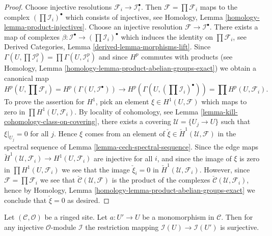 \begin{proof}
Choose injective resolutions $\mathcal{F}_i \to \mathcal{I}_i^\bullet$.
Then $\mathcal{F} = \prod \mathcal{F}_i$ maps to the complex
$(\prod \mathcal{I}_i)^\bullet$ which consists of injectives, see
Homology, Lemma \ref{homology-lemma-product-injectives}.
Choose an injective resolution $\mathcal{F} \to \mathcal{I}^\bullet$.
There exists a map of complexes
$\beta : \mathcal{I}^\bullet \to (\prod \mathcal{I}_i)^\bullet$ which
induces the identity on $\prod \mathcal{F}_i$, see
Derived Categories, Lemma
\ref{derived-lemma-morphisms-lift}.
Since $\Gamma(U, \prod \mathcal{I}^p_i) = \prod \Gamma(U, \mathcal{I}^p_i)$
and since $H^p$ commutes with products (see
Homology, Lemma \ref{homology-lemma-product-abelian-groups-exact})
we obtain a canonical map
$$
H^p(U, \prod\nolimits \mathcal{F}_i) = H^p(\Gamma(U, \mathcal{I}^\bullet))
\longrightarrow
H^p(\Gamma(U, (\prod \mathcal{I}_i)^\bullet)) =
\prod H^p(U, \mathcal{F}_i).
$$
To prove the assertion for $H^1$, pick an element
$\xi \in H^1(U, \mathcal{F})$ which maps to zero in
$\prod H^1(U, \mathcal{F}_i)$. By locality of cohomology, see
Lemma \ref{lemma-kill-cohomology-class-on-covering},
there exists a covering $\mathcal{U} = \{U_j \to U\}$ such that
$\xi|_{U_j} = 0$ for all $j$. Hence $\xi$ comes from an element of
$\check \xi \in \check H^1(\mathcal{U}, \mathcal{F})$ in the spectral
sequence of
Lemma \ref{lemma-cech-spectral-sequence}.
Since the edge maps
$\check H^1(\mathcal{U}, \mathcal{F}_i) \to H^1(U, \mathcal{F}_i)$
are injective for all $i$, and since the image of $\xi$ is zero
in $\prod H^1(U, \mathcal{F}_i)$ we see that the image
$\check \xi_i = 0$ in $\check H^1(\mathcal{U}, \mathcal{F}_i)$.
However, since $\mathcal{F} = \prod \mathcal{F}_i$ we see
that $\check{\mathcal{C}}(\mathcal{U}, \mathcal{F})$ is the
product of the complexes $\check{\mathcal{C}}(\mathcal{U}, \mathcal{F}_i)$,
hence by
Homology, Lemma \ref{homology-lemma-product-abelian-groups-exact}
we conclude that $\check \xi = 0$ as desired.
\end{proof}

\begin{lemma}
\label{lemma-restriction-along-monomorphism-surjective}
Let $(\mathcal{C}, \mathcal{O})$ be a ringed site. Let $a : U' \to U$ be a
monomorphism in $\mathcal{C}$. Then for any injective $\mathcal{O}$-module
$\mathcal{I}$ the restriction mapping $\mathcal{I}(U) \to \mathcal{I}(U')$
is surjective.
\end{lemma}

